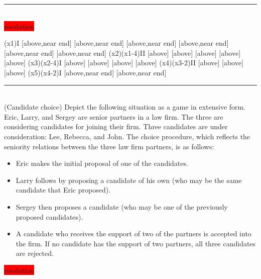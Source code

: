\documentclass[10pt]{report}
\newenvironment{exercise}[1]
    {\vspace{0.5cm}\hrule\vspace{0.5cm}\noindent\fbox{#1}\\}
    {\vspace{0.5cm}}
\newenvironment{response}
{\vspace{0.2cm}\noindent\colorbox{red}{resolution}}
    {\vspace{0.5cm}}
\begin{document}
\begin{exercise}{3.1}
\begin{response}
		\vspace{0.5cm}
		\begin{istgame}[sloped,font=\tiny]
			\setistOvalNodeStyle{.6cm}
			\xtShowEndPoints[oval node, minimum size=6pt]
			\xtdistance{28mm}{10mm}
			\istrooto[right](x1){I}
			[above,near end]
			[above,near end]
			[above,near end]
			[above,near end]
			[above,near end]
			[above,near end]
			\endist
			\istrooto[right](x2)(x1-4){II}
			[above]
			[above]
			[above]
			[above]
			[above]
			\endist
			\istrooto[right](x3)(x2-4){I}
			[above]
			[above]
			[above]
			[above]
			\endist
			\istrooto[right](x4)(x3-2){II}
			[above]
			[above]
			[above]
			\endist
			\istrooto[right](x5)(x4-2){I}
			[above,near end]{}
			[above,near end]{}
			\endist
		\end{istgame}

	\end{response}
\end{exercise}

\begin{exercise}{3.2}
	(Candidate choice) Depict the following situation as a game in extensive form. Eric, Larry, and Sergey are senior partners in a law firm. The three are considering candidates for joining their firm. Three candidates are under consideration: Lee, Rebecca, and John. The choice procedure, which reflects the seniority relations between the three law firm partners, is as follows:
	\begin{itemize}
		\item Eric makes the initial proposal of one of the candidates.
		\item Larry follows by proposing a candidate of his own (who may be the same candidate that Eric proposed).
		\item Sergey then proposes a candidate (who may be one of the previously proposed candidates).
		\item A candidate who receives the support of two of the partners is accepted into the firm. If no candidate has the support of two partners, all three candidates are rejected.
	\end{itemize}
	\begin{response}
	\end{response}
\end{exercise}
\end{document}

